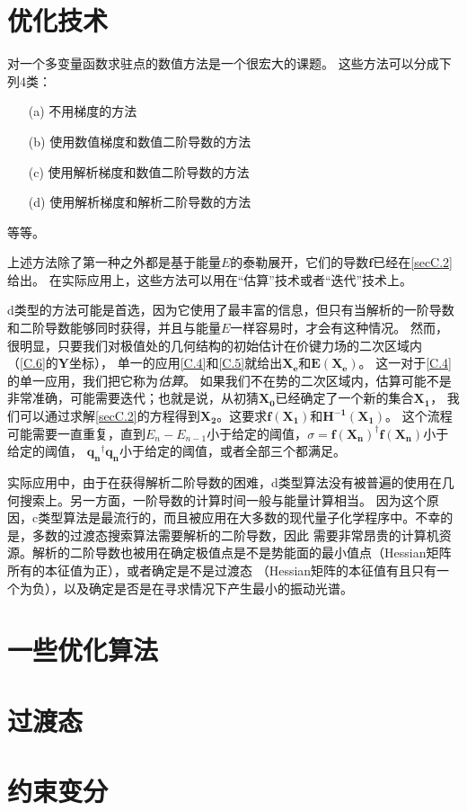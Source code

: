 \section{优化技术}
对一个多变量函数求驻点的数值方法是一个很宏大的课题。
这些方法可以分成下列4类：
\begin{enumerate}
	\item[(a) ] 不用梯度的方法
	\item[(b) ] 使用数值梯度和数值二阶导数的方法
	\item[(c) ] 使用解析梯度和数值二阶导数的方法
	\item[(d) ] 使用解析梯度和解析二阶导数的方法
\end{enumerate}
等等。

上述方法除了第一种之外都是基于能量$E$的泰勒展开，它们的导数$\mathbf{f}$已经在\autoref{secC.2}给出。
在实际应用上，这些方法可以用在“估算”技术或者“迭代”技术上。

d类型的方法可能是首选，因为它使用了最丰富的信息，但只有当解析的一阶导数和二阶导数能够同时获得，并且与能量$E$一样容易时，才会有这种情况。
然而，很明显，只要我们对极值处的几何结构的初始估计在价键力场的二次区域内（\autoref{C.6}的$\mathbf{Y}$坐标），
单一的应用\autoref{C.4}和\autoref{C.5}就给出$\mathbf{X_e}$和$\mathbf{E(X_e)}$。
这一对于\autoref{C.4}的单一应用，我们把它称为\textit{估算}。
如果我们不在势的二次区域内，估算可能不是非常准确，可能需要迭代；也就是说，从初猜$\mathbf{X_0}$已经确定了一个新的集合$\mathbf{X_1}$，
我们可以通过求解\autoref{secC.2}的方程得到$\mathbf{X_2}$。这要求$\mathbf{f(X_1)}$和$\mathbf{H^{-1}(X_1)}$。
这个流程可能需要一直重复，直到$E_n-E_{n-1}$小于给定的阈值，$\sigma =\mathbf{f(X_n)}^{\dagger}\mathbf{f(X_n)}$小于给定的阈值，
$\mathbf{q_n}^{\dagger}\mathbf{q_n}$小于给定的阈值，或者全部三个都满足。

实际应用中，由于在获得解析二阶导数的困难，d类型算法没有被普遍的使用在几何搜索上。另一方面，一阶导数的计算时间一般与能量计算相当。
因为这个原因，c类型算法是最流行的，而且被应用在大多数的现代量子化学程序中。不幸的是，多数的过渡态搜索算法需要解析的二阶导数，因此
需要非常昂贵的计算机资源。解析的二阶导数也被用在确定极值点是不是势能面的最小值点（Hessian矩阵所有的本征值为正），或者确定是不是过渡态
（Hessian矩阵的本征值有且只有一个为负），以及确定是否是在寻求情况下产生最小的振动光谱。

\section{一些优化算法}
\section{过渡态}
\section{约束变分}
\newpage
\theendnotes
{}
